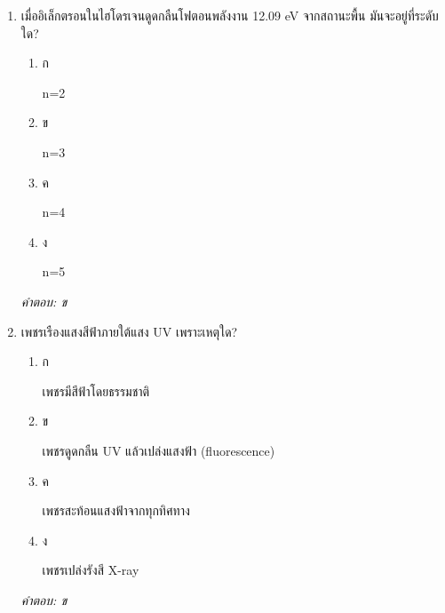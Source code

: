 \documentclass[12pt]{article}
\begin{document}
\begin{enumerate}[label=\arabic*., itemsep=0.5\baselineskip, topsep=0.5\baselineskip, leftmargin=*]
\item เมื่ออิเล็กตรอนในไฮโดรเจนดูดกลืนโฟตอนพลังงาน 12.09 eV จากสถานะพื้น มันจะอยู่ที่ระดับใด?
\begin{enumerate}[label=\alph*)., itemsep=0.3\baselineskip, topsep=0.3\baselineskip]
\item ก\ 
\begin{minipage}[t]{0.9\linewidth}
\raggedright n=2
\end{minipage}
\item ข\ 
\begin{minipage}[t]{0.9\linewidth}
\raggedright n=3
\end{minipage}
\item ค\ 
\begin{minipage}[t]{0.9\linewidth}
\raggedright n=4
\end{minipage}
\item ง\ 
\begin{minipage}[t]{0.9\linewidth}
\raggedright n=5
\end{minipage}
\end{enumerate}
\vspace{-0.3\baselineskip}
\begin{small}
\textit{คำตอบ: ข}
\end{small}

\item เพชรเรืองแสงสีฟ้าภายใต้แสง UV เพราะเหตุใด?
\begin{enumerate}[label=\alph*)., itemsep=0.3\baselineskip, topsep=0.3\baselineskip]
\item ก\ 
\begin{minipage}[t]{0.9\linewidth}
\raggedright เพชรมีสีฟ้าโดยธรรมชาติ
\end{minipage}
\item ข\ 
\begin{minipage}[t]{0.9\linewidth}
\raggedright เพชรดูดกลืน UV แล้วเปล่งแสงฟ้า (fluorescence)
\end{minipage}
\item ค\ 
\begin{minipage}[t]{0.9\linewidth}
\raggedright เพชรสะท้อนแสงฟ้าจากทุกทิศทาง
\end{minipage}
\item ง\ 
\begin{minipage}[t]{0.9\linewidth}
\raggedright เพชรเปล่งรังสี X-ray
\end{minipage}
\end{enumerate}
\vspace{-0.3\baselineskip}
\begin{small}
\textit{คำตอบ: ข}
\end{small}


\end{enumerate}
\end{document}
